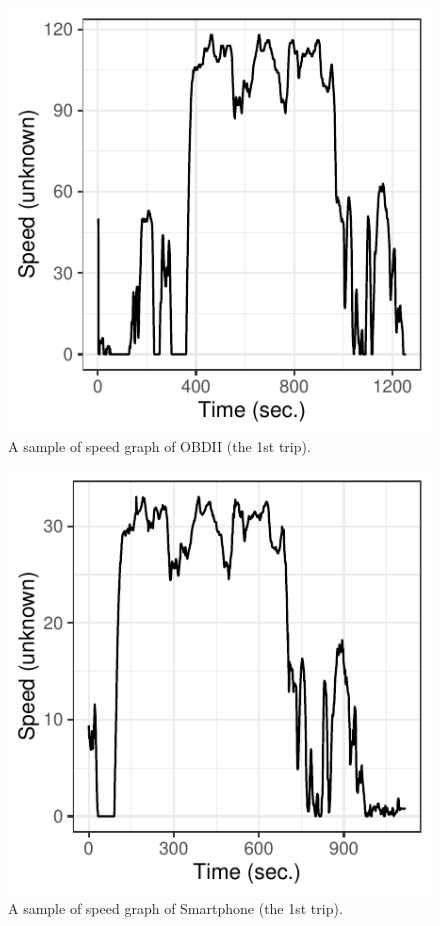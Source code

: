\documentclass[letterpaper,9pt,twocolumn,twoside,]{pinp}
\begin{document}
\begin{figure}

{\centering \includegraphics{report_issaclee_files/figure-latex/rawplot_obd2-1} 

}

\caption{A sample of speed graph of OBDII (the 1st trip).}\label{fig:rawplot_obd2}
\end{figure}

\begin{figure}

{\centering \includegraphics{report_issaclee_files/figure-latex/rawplot_mobile-1} 

}

\caption{A sample of speed graph of Smartphone (the 1st trip).}\label{fig:rawplot_mobile}
\end{figure}
\end{document}
